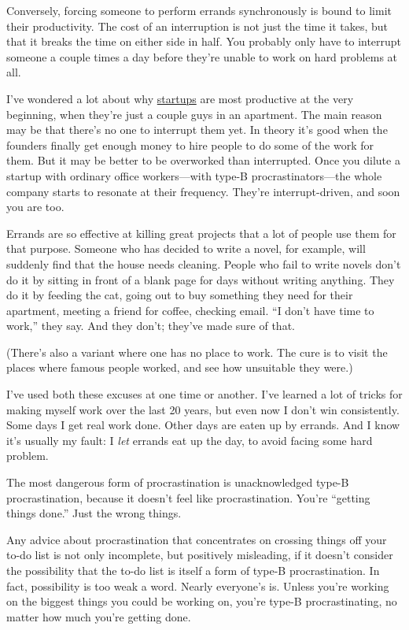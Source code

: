 \documentclass[12pt]{book}
\begin{document}
Conversely, forcing someone to perform errands synchronously is bound to
limit their productivity. The cost of an interruption is not just the
time it takes, but that it breaks the time on either side in half. You
probably only have to interrupt someone a couple times a day before
they're unable to work on hard problems at all.

I've wondered a lot about why \href{start.html}{startups} are most
productive at the very beginning, when they're just a couple guys in an
apartment. The main reason may be that there's no one to interrupt them
yet. In theory it's good when the founders finally get enough money to
hire people to do some of the work for them. But it may be better to be
overworked than interrupted. Once you dilute a startup with ordinary
office workers---with type-B procrastinators---the whole company starts
to resonate at their frequency. They're interrupt-driven, and soon you
are too.

Errands are so effective at killing great projects that a lot of people
use them for that purpose. Someone who has decided to write a novel, for
example, will suddenly find that the house needs cleaning. People who
fail to write novels don't do it by sitting in front of a blank page for
days without writing anything. They do it by feeding the cat, going out
to buy something they need for their apartment, meeting a friend for
coffee, checking email. ``I don't have time to work,'' they say. And
they don't; they've made sure of that.

(There's also a variant where one has no place to work. The cure is to
visit the places where famous people worked, and see how unsuitable they
were.)

I've used both these excuses at one time or another. I've learned a lot
of tricks for making myself work over the last 20 years, but even now I
don't win consistently. Some days I get real work done. Other days are
eaten up by errands. And I know it's usually my fault: I \emph{let}
errands eat up the day, to avoid facing some hard problem.

The most dangerous form of procrastination is unacknowledged type-B
procrastination, because it doesn't feel like procrastination. You're
``getting things done.'' Just the wrong things.

Any advice about procrastination that concentrates on crossing things
off your to-do list is not only incomplete, but positively misleading,
if it doesn't consider the possibility that the to-do list is itself a
form of type-B procrastination. In fact, possibility is too weak a word.
Nearly everyone's is. Unless you're working on the biggest things you
could be working on, you're type-B procrastinating, no matter how much
you're getting done.
\end{document}
